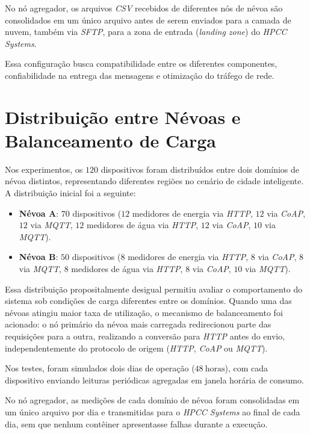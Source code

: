 No nó agregador, os arquivos \textit{CSV} recebidos de diferentes nós de névoa são consolidados em um único arquivo antes de serem enviados para a camada de nuvem, também via \textit{SFTP}, para a zona de entrada (\textit{landing zone}) do \textit{HPCC Systems}.

Essa configuração busca compatibilidade entre os diferentes componentes, confiabilidade na entrega das mensagens e otimização do tráfego de rede.

\section{Distribuição entre Névoas e Balanceamento de Carga}

Nos experimentos, os \(120\) dispositivos foram distribuídos entre dois domínios de névoa distintos, representando diferentes regiões no cenário de cidade inteligente.  
A distribuição inicial foi a seguinte:

\begin{itemize}
    \item \textbf{Névoa A}: \(70\) dispositivos  
    (\(12\) medidores de energia via \textit{HTTP}, \(12\) via \textit{CoAP}, \(12\) via \textit{MQTT}, \(12\) medidores de água via \textit{HTTP}, \(12\) via \textit{CoAP}, \(10\) via \textit{MQTT}).
    \item \textbf{Névoa B}: \(50\) dispositivos  
    (\(8\) medidores de energia via \textit{HTTP}, \(8\) via \textit{CoAP}, \(8\) via \textit{MQTT}, \(8\) medidores de água via \textit{HTTP}, \(8\) via \textit{CoAP}, \(10\) via \textit{MQTT}).
\end{itemize}

Essa distribuição propositalmente desigual permitiu avaliar o comportamento do sistema sob condições de carga diferentes entre os domínios.  
Quando uma das névoas atingiu maior taxa de utilização, o mecanismo de balanceamento foi acionado: o nó primário da névoa mais carregada redirecionou parte das requisições para a outra, realizando a conversão para \textit{HTTP} antes do envio, independentemente do protocolo de origem (\textit{HTTP}, \textit{CoAP} ou \textit{MQTT}).

Nos testes, foram simulados dois dias de operação (\(48\ \text{horas}\)), com cada dispositivo enviando leituras periódicas agregadas em janela horária de consumo.

No nó agregador, as medições de cada domínio de névoa foram consolidadas em um único arquivo por dia e transmitidas para o \textit{HPCC Systems} ao final de cada dia, sem que nenhum contêiner apresentasse falhas durante a execução.


